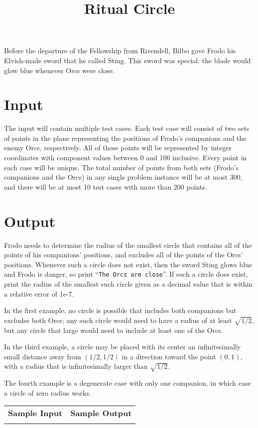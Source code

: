 \documentclass{article}
\title{Ritual Circle}
\date{}
\begin{document}
\maketitle

Before the departure of the Fellowship from Rivendell, Bilbo gave
Frodo his Elvish-made sword that he called Sting. This sword was
special: the blade would glow blue whenever Orcs were close.

\section{Input}

The input will contain multiple test cases. Each test case will consist of
two sets of points in the plane representing the positions of Frodo's
companions and the enemy Orcs, respectively. All of these points will be
represented by integer coordinates with component values between 0 and
100 inclusive. Every point in each case will be unique. The total
number of points from both sets (Frodo's companions and the Orcs) in
any single problem instance will be at most 300, and there will be
at most 10 test cases with more than 200 points.

\section{Output}

Frodo needs to determine the radius of the smallest circle that contains all of
the points of his companions' positions, and excludes all of the points of the
Orcs' positions. Whenever such a circle does not exist, then the sword Sting
glows blue and Frodo is danger, so print ``\verb+The Orcs are close+''. If
such a circle does exist, print the radius of the smallest such circle 
given as a decimal value that is within a relative error of 1e-7.

In the first example, no circle is possible that includes both
companions but excludes both Orcs; any such circle would need to
have a radius of at least $\sqrt{1/2}$, but any circle that
large would need to include at least one of the Orcs.

In the third example, a circle may be placed with its center an infinitesimally
small distance away from $(1/2, 1/2)$ in a direction toward the point $(0, 1)$,
with a radius that is infinitesimally larger than $\sqrt{1/2}$.

The fourth example is a degenerate case with only one companion, in
which case a circle of zero radius works.

\vskip 16pt
\noindent
\setlength{\extrarowheight}{4pt}
\begin{tabularx}{\textwidth}{ | X | X | }
\hline
\textbf{Sample Input} & \textbf{Sample Output} \\

&

\\
\hline
\end{tabularx}
\end{document}
